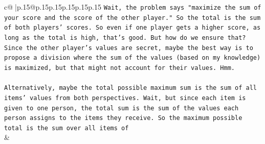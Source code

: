 \documentclass{article}
\begin{document}
{\begin{supertabular}{c@{$\;$}|p{.15\linewidth}@{}p{.15\linewidth}p{.15\linewidth}p{.15\linewidth}p{.15\linewidth}p{.15\linewidth}}
{{{\texttt{Wait, the problem says "maximize the sum of your score and the score of the other player." So the total is the sum of both players' scores. So even if one player gets a higher score, as long as the total is high, that's good. But how do we ensure that? Since the other player's values are secret, maybe the best way is to propose a division where the sum of the values (based on my knowledge) is maximized, but that might not account for their values. Hmm.} \\
\\ 
\texttt{Alternatively, maybe the total possible maximum sum is the sum of all items' values from both perspectives. Wait, but since each item is given to one person, the total sum is the sum of the values each person assigns to the items they receive. So the maximum possible total is the sum over all items of} \\
            }
        }
    }
    & \\ \\


\end{supertabular}}
\end{document}
